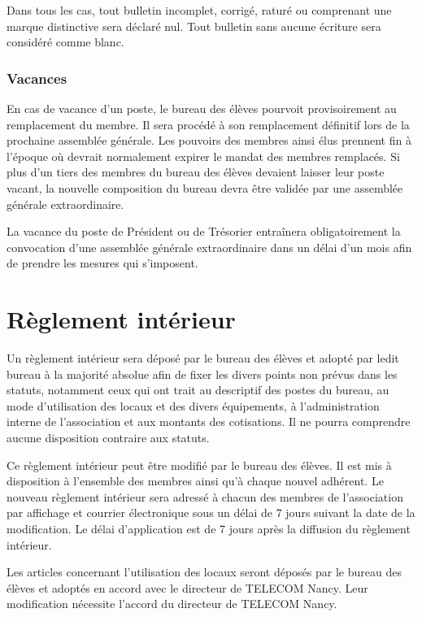 \documentclass{article}
\begin{document}
				Dans tous les cas, tout bulletin incomplet, corrigé, raturé ou
				comprenant une marque distinctive sera déclaré nul. Tout
				bulletin sans aucune écriture sera considéré comme blanc.

			\subsubsection{Vacances}
\label{ssub:vacances}
			
				En cas de vacance d'un poste, le bureau des élèves pourvoit
				provisoirement au remplacement du membre. Il sera procédé à son
				remplacement définitif lors de la prochaine assemblée générale.
				Les pouvoirs des membres ainsi élus prennent fin à l’époque où
				devrait normalement expirer le mandat des membres remplacés. Si
				plus d’un tiers des membres du bureau des élèves devaient
				laisser leur poste vacant, la nouvelle composition du bureau
				devra être validée par une assemblée générale extraordinaire.

				La vacance du poste de Président ou de Trésorier entraînera
				obligatoirement la convocation d’une assemblée générale
				extraordinaire dans un délai d’un mois afin de prendre les
				mesures qui s’imposent.

	\section{Règlement intérieur}
\label{sec:reglement_interieur}
	
		Un règlement intérieur sera déposé par le bureau des élèves et adopté
		par ledit bureau à la majorité absolue afin de fixer les divers points
		non prévus dans les statuts, notamment ceux qui ont trait au descriptif
		des postes du bureau, au mode d’utilisation des locaux et des divers
		équipements, à l’administration interne de l’association et aux montants
		des cotisations. Il ne pourra comprendre aucune disposition contraire
		aux statuts.

		Ce règlement intérieur peut être modifié par le bureau des élèves. Il
		est mis à disposition à l’ensemble des membres ainsi qu’à chaque nouvel
		adhérent. Le nouveau règlement intérieur sera adressé à chacun des
		membres de l'association par affichage et courrier électronique sous un
		délai de 7 jours suivant la date de la modification. Le délai
		d’application est de 7 jours après la diffusion du règlement intérieur.

		Les articles concernant l’utilisation des locaux seront déposés par le
		bureau des élèves et adoptés en accord avec le directeur de TELECOM
		Nancy. Leur modification nécessite l’accord du directeur de TELECOM
		Nancy.
\end{document}
